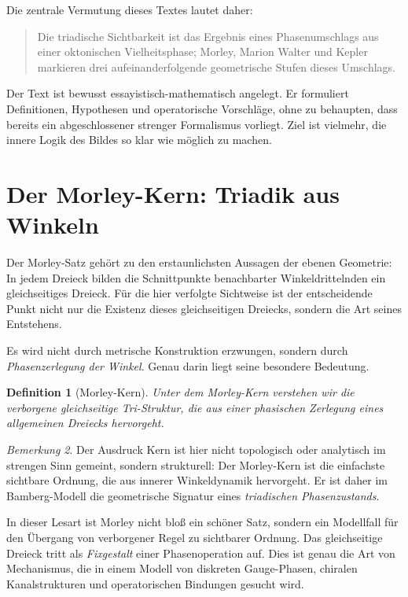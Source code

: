 \documentclass[11pt,a4paper]{article}
\newtheorem{definition}{Definition}[section]
\theoremstyle{remark}
\newtheorem{bemerkung}[definition]{Bemerkung}
\begin{document}
	Die zentrale Vermutung dieses Textes lautet daher:
	\begin{quote}
		Die triadische Sichtbarkeit ist das Ergebnis eines Phasenumschlags aus einer oktonischen Vielheitsphase; Morley, Marion Walter und Kepler markieren drei aufeinanderfolgende geometrische Stufen dieses Umschlags.
	\end{quote}
	
	Der Text ist bewusst essayistisch-mathematisch angelegt. Er formuliert Definitionen, Hypothesen und operatorische Vorschläge, ohne zu behaupten, dass bereits ein abgeschlossener strenger Formalismus vorliegt. Ziel ist vielmehr, die innere Logik des Bildes so klar wie möglich zu machen.
	
	\section{Der Morley-Kern: Triadik aus Winkeln}
	
	Der Morley-Satz gehört zu den erstaunlichsten Aussagen der ebenen Geometrie: In jedem Dreieck bilden die Schnittpunkte benachbarter Winkeldrittelnden ein gleichseitiges Dreieck. Für die hier verfolgte Sichtweise ist der entscheidende Punkt nicht nur die Existenz dieses gleichseitigen Dreiecks, sondern die Art seines Entstehens.
	
	Es wird nicht durch metrische Konstruktion erzwungen, sondern durch \emph{Phasenzerlegung der Winkel}. Genau darin liegt seine besondere Bedeutung.
	
	\begin{definition}[Morley-Kern]
		Unter dem \emph{Morley-Kern} verstehen wir die verborgene gleichseitige Tri-Struktur, die aus einer phasischen Zerlegung eines allgemeinen Dreiecks hervorgeht.
	\end{definition}
	
	\begin{bemerkung}
		Der Ausdruck \glqq Kern\grqq{} ist hier nicht topologisch oder analytisch im strengen Sinn gemeint, sondern strukturell: Der Morley-Kern ist die einfachste sichtbare Ordnung, die aus innerer Winkeldynamik hervorgeht. Er ist daher im Bamberg-Modell die geometrische Signatur eines \emph{triadischen Phasenzustands}.
	\end{bemerkung}
	
	In dieser Lesart ist Morley nicht bloß ein schöner Satz, sondern ein Modellfall für den Übergang von verborgener Regel zu sichtbarer Ordnung. Das gleichseitige Dreieck tritt als \emph{Fixgestalt} einer Phasenoperation auf. Dies ist genau die Art von Mechanismus, die in einem Modell von diskreten Gauge-Phasen, chiralen Kanalstrukturen und operatorischen Bindungen gesucht wird.
	
\end{document}
